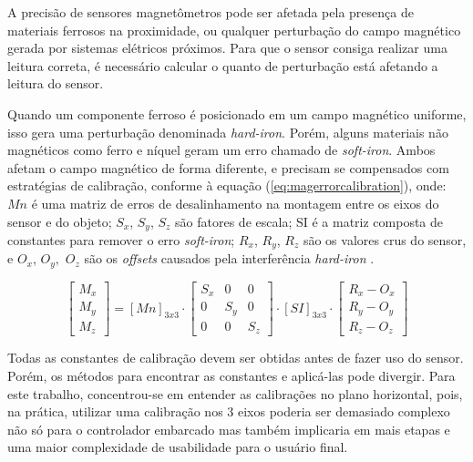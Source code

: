 A precisão de sensores magnetômetros pode ser afetada pela presença de materiais ferrosos na proximidade, ou qualquer perturbação do campo magnético gerada por sistemas elétricos próximos. Para que o sensor consiga realizar uma leitura correta, é necessário calcular o quanto de perturbação está afetando a leitura do sensor.

Quando um componente ferroso é posicionado em um campo magnético uniforme, isso gera uma perturbação denominada \textit{hard-iron}. Porém, alguns materiais não magnéticos como ferro e níquel geram um erro chamado de \textit{soft-iron}. Ambos afetam o campo magnético de forma diferente, e precisam se compensados com estratégias de calibração, conforme à equação (\ref{eq:magerrorcalibration}), onde: $ Mn $ é uma matriz de erros de desalinhamento na montagem entre os eixos do sensor e do objeto; $S_x$, $S_y$, $S_z$ são fatores de escala; SI é a matriz composta de constantes para remover o erro \textit{soft-iron}; $R_x$, $R_y$, $R_z$ são os valores crus do sensor, e $O_x$, $O_y,$ $O_z$ são os \textit{offsets} causados pela interferência \textit{hard-iron} \cite{calibrationMatrix}.

\begin{equation}
	\left[\begin{array}{c}  M_x\\M_y\\M_z \end{array}\right] = \left[Mn\right]_{3x3} \cdot \left[\begin{array}{ccc} S_x&0&0\\ 0&S_y&0\\ 0&0&S_z \end{array}\right]\cdot \left[SI\right]_{3x3} \cdot \left[\begin{array}{c} R_x - O_x\\R_y - O_y\\R_z - O_z \end{array}\right]
	\label{eq:magerrorcalibration}
\end{equation}

Todas as constantes de calibração devem ser obtidas antes de fazer uso do sensor. Porém, os métodos para encontrar as constantes e aplicá-las pode divergir. Para este trabalho, concentrou-se em entender as calibrações no plano horizontal, pois, na prática, utilizar uma calibração nos 3 eixos poderia ser demasiado complexo não só para o controlador embarcado mas também implicaria em mais etapas e uma maior complexidade de usabilidade para o usuário final.


